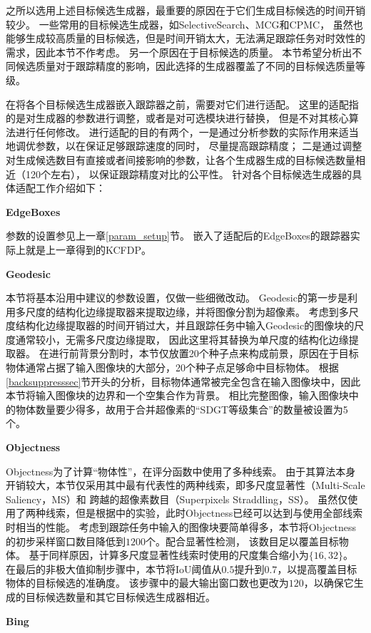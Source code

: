 之所以选用上述目标候选生成器，最重要的原因在于它们生成目标候选的时间开销较少。
一些常用的目标候选生成器，如SelectiveSearch、MCG和CPMC，
虽然也能够生成较高质量的目标候选，但是时间开销太大，无法满足跟踪任务对时效性的需求，因此本节不作考虑。
另一个原因在于目标候选的质量。
本节希望分析出不同候选质量对于跟踪精度的影响，因此选择的生成器覆盖了不同的目标候选质量等级。

在将各个目标候选生成器嵌入跟踪器之前，需要对它们进行适配。
这里的适配指的是对生成器的参数进行调整，或者是对可选模块进行替换，
但是不对其核心算法进行任何修改。
进行适配的目的有两个，一是通过分析参数的实际作用来适当地调优参数，以在保证足够跟踪速度的同时，
尽量提高跟踪精度；
二是通过调整对生成候选数目有直接或者间接影响的参数，让各个生成器生成的目标候选数量相近（120个左右），
以保证跟踪精度对比的公平性。
针对各个目标候选生成器的具体适配工作介绍如下：
\begin{compactitem}
\item \textbf{EdgeBoxes}
\end{compactitem}

参数的设置参见上一章\ref{param_setup}节。
嵌入了适配后的EdgeBoxes的跟踪器实际上就是上一章得到的KCFDP。
\begin{compactitem}
\item \textbf{Geodesic}
\end{compactitem}

本节将基本沿用\cite{dpsurvey}中建议的参数设置，仅做一些细微改动。
Geodesic的第一步是利用多尺度的结构化边缘提取器来提取边缘，并将图像分割为超像素。
考虑到多尺度结构化边缘提取器的时间开销过大，并且跟踪任务中输入Geodesic的图像块的尺度通常较小，无需多尺度边缘提取，
因此这里将其替换为单尺度的结构化边缘提取器。
在进行前背景分割时，本节仅放置20个种子点来构成前景，原因在于目标物体通常占据了输入图像块的大部分，20个种子点足够命中目标物体。
根据\ref{backsuppresssec}节开头的分析，目标物体通常被完全包含在输入图像块中，因此本节将输入图像块的边界和一个空集合作为背景。
相比完整图像，输入图像块中的物体数量要少得多，故用于合并超像素的``SDGT等级集合''的数量被设置为5个。
\begin{compactitem}
\item \textbf{Objectness}
\end{compactitem}

Objectness为了计算``物体性''，在评分函数中使用了多种线索。
由于其算法本身开销较大，本节仅采用其中最有代表性的两种线索，即多尺度显著性（Multi-Scale Saliency，MS）和
跨越的超像素数目（Superpixels Straddling，SS）。
虽然仅使用了两种线索，但是根据\cite{objectness}中的实验，此时Objectness已经可以达到与使用全部线索时相当的性能。
考虑到跟踪任务中输入的图像块要简单得多，本节将Objectness的初步采样窗口数目降低到$1200$个。配合显著性检测，
该数目足以覆盖目标物体。
基于同样原因，计算多尺度显著性线索时使用的尺度集合缩小为$\{16, 32\}$。
在最后的非极大值抑制步骤中，本节将IoU阈值从$0.5$提升到$0.7$，以提高覆盖目标物体的目标候选的准确度。
该步骤中的最大输出窗口数也更改为$120$，以确保它生成的目标候选数量和其它目标候选生成器相近。
\begin{compactitem}
\item \textbf{Bing}
\end{compactitem}

